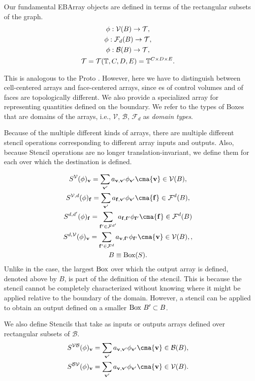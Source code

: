 \documentclass[12pt]{article}
\newcommand{\mcl}[1]{{\mathcal{#1}}}
\newcommand{\MBox}{{\rm{Box}}}
\newcommand{\vof}{{\mbf{v}}}
\newcommand{\face}{{\mbf{f}}}
\begin{document}
Our fundamental EBArray objects are defined in terms of the rectangular subsets of the graph.
\begin{gather*}
\phi : \mcl{V}(B) \rightarrow \mcl{T} ,\\
\phi : \mcl{F}_d (B) \rightarrow \mcl{T}, \\
\phi : \mcl{B}(B) \rightarrow \mcl{T}, \\
\mcl{T} = \mcl{T}(\mbb{T},C,D,E) = \mbb{T}^{C \times D \times E}.
\end{gather*}

This is analogous to the Proto . However, here we have to distinguish between cell-centered arrays and face-centered arrays, since es of control volumes and of faces are topologically different. We also provide a specialized array for representing quantities defined on the boundary. We refer to the types of Boxes that are domains of the arrays, i.e., $\mcl{V}$, $\mcl{B}$, $\mcl{F}_d$ as {\it domain types}.

Because of the multiple different kinds of arrays, there are multiple different stencil operations corresponding to different array inputs and outputs. Also, because Stencil operations are no longer translation-invariant, we define them for each  over which the destination is defined.

\begin{gather*}
S^{\mcl{V}}(\phi)_\vof = \sum \limits_{\vof '} a_{\vof,\vof'} \phi_{\vof'} \cma \vof \in \mcl{V}(B) , \\
S^{\mcl{V},d}(\phi)_\face = \sum \limits_{\vof '} a_{\face,\vof'} \phi_{\vof'} \cma \face \in \mcl{F}^d (B) ,
\\S^{d,d'}(\phi)_\face = \sum \limits_{\face ' \in \mcl{F}^{d'}} a_{\face,\face'} \phi_{\face'} \cma \face \in \mcl{F}^d (B) 
\\S^{d,\mcl{V}}(\phi)_\vof = \sum \limits_{\face ' \in \mcl{F}^d} a_{\vof,\face'} \phi_{\face'} \cma \vof \in \mcl{V}(B) ,
, \\
B \equiv {\rm Box}(S).
\end{gather*}
Unlike in the  case, the largest $\MBox$ over which the output array is defined, denoted above by $B$, is part of the definition of the stencil. This is because the stencil cannot be completely characterized without knowing where it might be applied relative to the boundary of the domain. However, a stencil can be applied to obtain an output defined on a smaller $\MBox ~ B' \subset B$. 

We also define Stencils that take as inputs or outputs arrays defined over rectangular subsets of $\mcl{B}$.
\begin{gather*}
S^{\mcl{V}\mcl{B}}(\phi)_\vof = \sum \limits_{\vof '} a_{\vof,\vof'} \phi_{\vof'} \cma \vof \in \mcl{B}(B),  \\
S^{\mcl{B}\mcl{V}}(\phi)_\vof = \sum \limits_{\vof '} a_{\vof,\vof'} \phi_{\vof'} \cma \vof \in \mcl{V}(B) .
\end{gather*}
\end{document}
